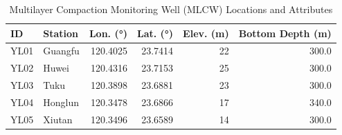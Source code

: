 \begin{table}[htbp]
	\centering
	\caption{Multilayer Compaction Monitoring Well (MLCW) Locations and Attributes}
	\label{tab:mlcw_info}
	\begin{tabular}{llrrrr}
		\toprule
		\textbf{ID} & \textbf{Station} & \textbf{Lon. (\si{\degree})} & \textbf{Lat. (\si{\degree})} & \textbf{Elev. (m)} & \textbf{Bottom Depth (m)} \\
		\midrule
		YL01 & Guangfu  & 120.4025 & 23.7414 & 22 & 300.0 \\
		YL02 & Huwei    & 120.4316 & 23.7153 & 25 & 300.0 \\
		YL03 & Tuku     & 120.3898 & 23.6881 & 23 & 300.0 \\
		YL04 & Honglun  & 120.3478 & 23.6866 & 17 & 340.0 \\
		YL05 & Xiutan   & 120.3496 & 23.6589 & 14 & 300.0 \\
		\bottomrule
	\end{tabular}
\end{table}

